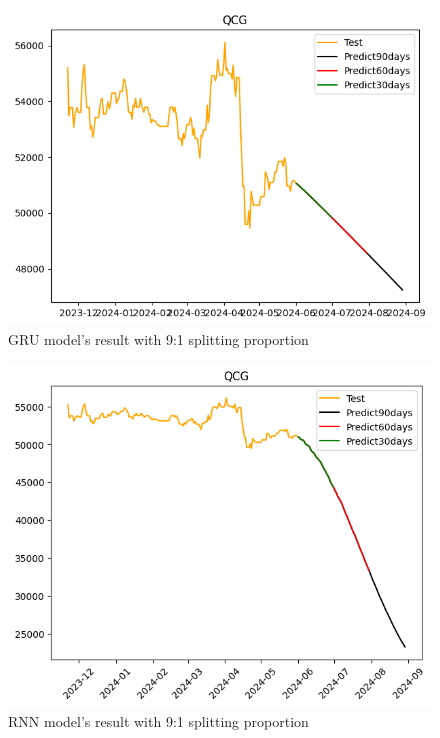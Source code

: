 \documentclass{ieeeojies}
\begin{document}
\begin{figure}[H]
  \centering
  \begin{minipage}{0.8\linewidth}
    \centering
        \includegraphics[width=\linewidth]{bibliography/Figure/QCGGRU_9-1.png}
    \caption{GRU model’s result with 9:1 splitting proportion}
    \label{fig28}
  \end{minipage}
\end{figure}

\begin{figure}[H]
  \centering
  \begin{minipage}{0.8\linewidth}
    \centering
        \includegraphics[width=\linewidth]{bibliography/Figure/QCGRNN_9-1.png}
    \caption{RNN model’s result with 9:1 splitting proportion}
    \label{fig28}
  \end{minipage}
\end{figure}
\end{document}

